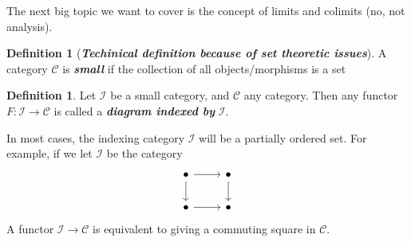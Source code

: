 \documentclass[psamsfonts]{amsart}
\theoremstyle{definition}
\newtheorem{defn}[thm]{Definition}
\theoremstyle{remark}
\newcommand{\ib}[1]{\textbf{\textit{#1}}}
\begin{document}
The next big topic we want to cover is the concept of limits and colimits (no, not analysis).
%
\begin{defn}[\ib{Techinical definition because of set theoretic issues}]
A category $\mathscr{C}$ is \ib{small} if the collection of all objects/morphisms is a set
\end{defn}
%
\begin{defn}
Let $\mathscr{I}$ be a small category, and $\mathscr{C}$ any category. Then any functor $F : \mathscr{I} \to \mathscr{C}$ is called a \ib{diagram indexed by} $\mathscr{I}$.
\end{defn}
In most cases, the indexing category $\mathscr{I}$ will be a partially ordered set. For example, if we let $\mathscr{I}$ be the category
$$\begin{tikzcd}
  \bullet \arrow[r] \arrow[d] & \bullet \arrow[d] \\
  \bullet \arrow[r] & \bullet
  \end{tikzcd}
$$
A functor $\mathscr{I} \to \mathscr{C}$ is equivalent to giving a commuting square in $\mathscr{C}$. 
%
\end{document}
